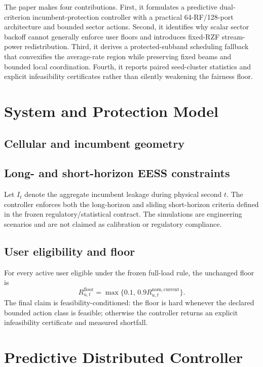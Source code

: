 \documentclass[journal]{IEEEtran}
\newcommand{\floor}{\mathrm{floor}}
\begin{document}
The paper makes four contributions. First, it formulates a predictive dual-criterion incumbent-protection controller with a practical 64-RF/128-port architecture and bounded sector actions. Second, it identifies why scalar sector backoff cannot generally enforce user floors and introduces fixed-RZF stream-power redistribution. Third, it derives a protected-subband scheduling fallback that convexifies the average-rate region while preserving fixed beams and bounded local coordination. Fourth, it reports paired seed-cluster statistics and explicit infeasibility certificates rather than silently weakening the fairness floor.

\section{System and Protection Model}
\subsection{Cellular and incumbent geometry}
\subsection{Long- and short-horizon EESS constraints}
Let $I_t$ denote the aggregate incumbent leakage during physical second $t$. The controller enforces both the long-horizon and sliding short-horizon criteria defined in the frozen regulatory/statistical contract. The simulations are engineering scenarios and are not claimed as calibration or regulatory compliance.
\subsection{User eligibility and floor}
For every active user eligible under the frozen full-load rule, the unchanged floor is
\begin{equation}
 R^{\floor}_{u,t}=\max\{0.1,\,0.9R^{\mathrm{nom,current}}_{u,t}\}.
\end{equation}
The final claim is feasibility-conditioned: the floor is hard whenever the declared bounded action class is feasible; otherwise the controller returns an explicit infeasibility certificate and measured shortfall.

\section{Predictive Distributed Controller}
\end{document}
